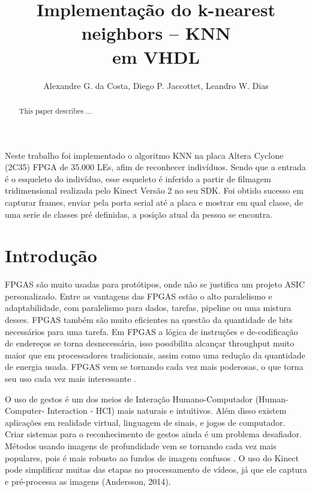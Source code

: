 \documentclass[12pt]{article}
\title{Implementa\c{c}\~ao do k-nearest neighbors -- KNN\\ em VHDL}
\author{Alexandre G. da Costa\inst{1}, Diego P. Jaccottet\inst{1}, Leandro W.
  Dias\inst{1} }
\begin{document}
 

\maketitle

\begin{abstract}
  This paper describes ...
\end{abstract}
     
\begin{resumo}

Neste trabalho foi implementado o algoritmo KNN na placa Altera Cyclone (2C35)
FPGA de 35.000 LEs, afim de reconhecer indivíduos. Sendo que a entrada é o
esqueleto do indivíduo, esse esqueleto é inferido a partir de filmagem 
tridimensional realizada pelo Kinect Versão 2 no seu SDK. Foi obtido sucesso em
capturar frames, enviar pela porta serial até a placa e mostrar em qual classe,
de uma serie de classes pré definidas, a posição atual da pessoa se encontra.

\end{resumo}

\section{Introdu\c{c}\~ao}

FPGAS são muito usadas para protótipos, onde não se justifica um projeto ASIC
personalizado. Entre as vantagens das FPGAS estão o alto paralelismo e
adaptabilidade, com paralelismo para dados, tarefas, pipeline ou uma mistura
desses. FPGAS também são muito eficientes na questão da quantidade de bits
necessários para uma tarefa. Em FPGAS a lógica de instruções e de-codificação
de endereços se torna desnecessária, isso possibilita alcançar throughput muito
maior que em processadores tradicionais, assim como uma redução da quantidade
de energia usada. FPGAS vem se tornando cada vez mais poderosas, o que torna
seu uso cada vez mais interessante \cite{najjar2003high}.

O uso de gestos é um dos meios de Interação Humano-Computador (Human-Computer-
Interaction - HCI) mais naturais e intuitivos. Além disso existem aplicações em
realidade virtual, linguagem de sinais, e jogos de computador. Criar sistemas
para o reconhecimento de gestos ainda é um problema desafiador. Métodos usando
imagens de profundidade vem se tornando cada vez mais populares, pois é mais
robusto ao fundos de imagem confusos \cite{ren2011robust}. O uso do Kinect pode
simplificar muitas das etapas no processamento de vídeos, já que ele captura e
pré-processa as imagens (Andersson, 2014).
\end{document}
